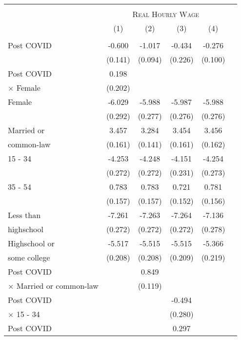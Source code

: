 \begin{tabular*}{\textwidth}{ @{\extracolsep{\fill}}l*{5}{c}}
\hline\hline
\\
& \multicolumn{4}{c}{ \textsc{Real Hourly Wage} } \\
                &\multicolumn{1}{c}{(1)}&\multicolumn{1}{c}{(2)}&\multicolumn{1}{c}{(3)}&\multicolumn{1}{c}{(4)}\\
\hline
\\
Post COVID      &   -0.600&   -1.017&   -0.434&   -0.276\\
                &  (0.141)&  (0.094)&  (0.226)&  (0.100)\\
[0.5em]
Post COVID      &    0.198&         &         &         \\
$\times$ Female &  (0.202)&         &         &         \\
[0.5em]
Female          &   -6.029&   -5.988&   -5.987&   -5.988\\
                &  (0.292)&  (0.277)&  (0.276)&  (0.276)\\
[0.5em]
Married or      &    3.457&    3.284&    3.454&    3.456\\
common-law      &  (0.161)&  (0.141)&  (0.161)&  (0.162)\\
[0.5em]
15 - 34         &   -4.253&   -4.248&   -4.151&   -4.254\\
                &  (0.272)&  (0.272)&  (0.231)&  (0.273)\\
[0.5em]
35 - 54         &    0.783&    0.783&    0.721&    0.781\\
                &  (0.157)&  (0.157)&  (0.152)&  (0.156)\\
[0.5em]
Less than       &   -7.261&   -7.263&   -7.264&   -7.136\\
highschool      &  (0.272)&  (0.272)&  (0.272)&  (0.278)\\
[0.5em]
Highschool or   &   -5.517&   -5.515&   -5.515&   -5.366\\
some college    &  (0.208)&  (0.208)&  (0.209)&  (0.219)\\
[0.5em]
Post COVID      &         &    0.849&         &         \\
$\times$ Married or common-law&         &  (0.119)&         &         \\
[0.5em]
Post COVID      &         &         &   -0.494&         \\
$\times$ 15 - 34&         &         &  (0.280)&         \\
[0.5em]
Post COVID      &         &         &    0.297&         \\

\end{tabular*}
